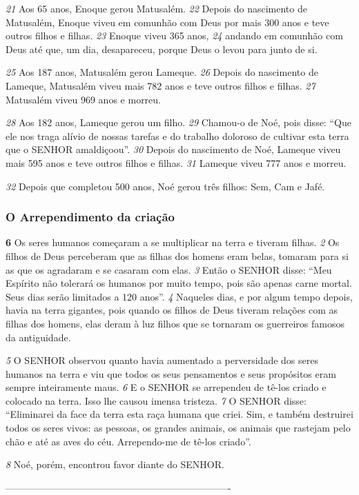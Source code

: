\bigskip
\textit{\tiny 21}
Aos 65 anos, Enoque gerou Matusalém.  
\textit{\tiny 22}
Depois do nascimento de Matusalém,
 Enoque viveu em comunhão com Deus por mais 300 anos e teve outros filhos e
 filhas.  
\textit{\tiny 23}
Enoque viveu 365 anos,  
\textit{\tiny 24}
andando em comunhão com Deus até que,
 um dia, desapareceu, porque Deus o levou para junto de si.

\bigskip
\textit{\tiny 25}
Aos 187 anos, Matusalém gerou Lameque.  
\textit{\tiny 26}
Depois do nascimento de
 Lameque, Matusalém viveu mais 782 anos e teve outros filhos e filhas.
\textit{\tiny 27}
Matusalém viveu 969 anos e morreu.

\bigskip
\textit{\tiny 28}
Aos 182 anos, Lameque gerou um filho.  
\textit{\tiny 29}
Chamou-o de Noé, pois disse: “Que
 ele nos traga alívio de nossas tarefas e do trabalho doloroso de cultivar esta terra
 que o SENHOR amaldiçoou”.  
\textit{\tiny 30}
Depois do nascimento de Noé, Lameque viveu mais
 595 anos e teve outros filhos e filhas.  
\textit{\tiny 31}
Lameque viveu 777 anos e morreu.

\bigskip
\textit{\tiny 32}
Depois que completou 500 anos, Noé gerou três filhos: Sem, Cam e Jafé.

\bigskip
\subsubsection*{O Arrependimento da criação}
\textbf{\large 6} 
Os seres humanos começaram a se multiplicar na terra e tiveram filhas. 
\textit{\tiny 2}
Os filhos de Deus perceberam que as filhas dos homens eram belas, tomaram para si
as que os agradaram e se casaram com elas. 
\textit{\tiny 3}
Então o SENHOR disse: “Meu Espírito
não tolerará os humanos por muito tempo, pois são apenas carne mortal. Seus
dias serão limitados a 120 anos”.
\textit{\tiny 4}
Naqueles dias, e por algum tempo depois, havia na terra gigantes, pois
quando os filhos de Deus tiveram relações com as filhas dos homens, elas deram à
luz filhos que se tornaram os guerreiros famosos da antiguidade.

\bigskip
\textit{\tiny 5}
O SENHOR observou quanto havia aumentado a perversidade dos seres
humanos na terra e viu que todos os seus pensamentos e seus propósitos eram
sempre inteiramente maus. 
\textit{\tiny 6}
E o SENHOR se arrependeu de tê-los criado e colocado
na terra. Isso lhe causou imensa tristeza. 
\textit{\tiny 7}
O SENHOR disse: “Eliminarei da face da
terra esta raça humana que criei. Sim, e também destruirei todos os seres vivos: as
pessoas, os grandes animais, os animais que rastejam pelo chão e até as aves do
céu. Arrependo-me de tê-los criado”. 

\bigskip
\textit{\tiny 8}
Noé, porém, encontrou favor diante do
SENHOR.

----------------------------------------------------------------------
